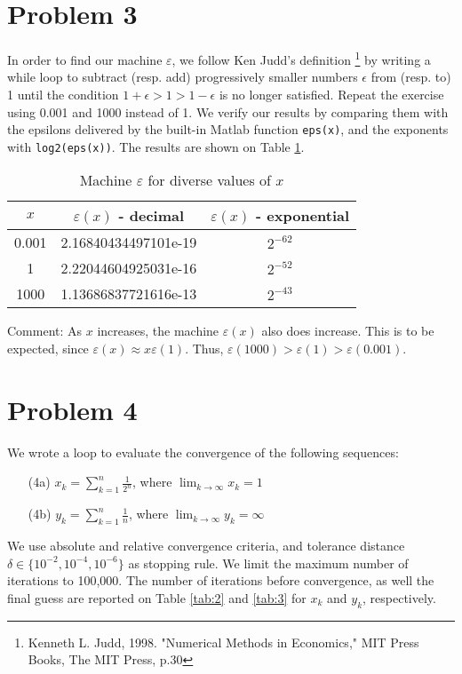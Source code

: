 \documentclass[11pt]{article}
\newcommand{\1}{\mathbbm{1}}
\newcounter{daggerfootnote}
\newcommand*{\daggerfootnote}[1]{%
	\setcounter{daggerfootnote}{\value{footnote}}%
	\renewcommand*{\thefootnote}{\fnsymbol{footnote}}%
	\footnote[2]{#1}%
	\setcounter{footnote}{\value{daggerfootnote}}%
	\renewcommand*{\thefootnote}{\arabic{footnote}}%
}
\begin{document}
\section*{Problem 3}
	In order to find our machine $\varepsilon$, we follow Ken Judd's definition\daggerfootnote{Kenneth L. Judd, 1998. "Numerical Methods in Economics," MIT Press Books, The MIT Press, p.30} by writing a while loop to subtract (resp. add) progressively smaller numbers $\epsilon$ from (resp. to) 1 until the condition $1+\epsilon > 1 > 1-\epsilon$ is no longer satisfied. Repeat the exercise using 0.001 and 1000 instead of 1. We verify our results by comparing them with the epsilons delivered by the built-in Matlab function \texttt{eps(x)}, and the exponents with \texttt{log2(eps(x))}. The results are shown on Table \ref{tab:1}.
	
	\begin{table}[h]
		\centering
		\begin{tabular}{ | c | c | c |}
			\hline
			\hline
			$x$ & $\varepsilon(x)$ - decimal & $\varepsilon(x)$ - exponential \\	
			\hline
			0.001 & 2.16840434497101e-19 & $2^{-62}$ \\ \hline
			1 & 2.22044604925031e-16 & $2^{-52}$ \\ \hline
			1000 & 1.13686837721616e-13 & $2^{-43}$ \\
			\hline
			\hline
		\end{tabular} 
		\caption{Machine $\varepsilon$ for diverse values of $x$}
		\label{tab:1}
	\end{table}
Comment: As $x$ increases, the machine $\varepsilon(x)$ also does increase. This is to be expected, since $\varepsilon(x)\approx x\varepsilon(1)$. Thus, $\varepsilon(1000)>\varepsilon(1)>\varepsilon(0.001)$.
	
\section*{Problem 4} 
We wrote a loop to evaluate the convergence of the following sequences: 
\begin{enumerate}
	\item[(4a)] $x_k=\sum_{k=1}^{n}\frac{1}{2^n}$, where $\lim_{k\rightarrow\infty}x_k=1$
	\item[(4b)] $y_k=\sum_{k=1}^{n}\frac{1}{n}$, where $\lim_{k\rightarrow\infty}y_k=\infty$
\end{enumerate}
We use absolute and relative convergence criteria, and tolerance distance $\delta\in\{10^{-2},10^{-4},10^{-6}\}$ as stopping rule. We limit the maximum number of iterations to 100,000. The number of iterations before convergence, as well the final guess are reported on Table \ref{tab:2} and \ref{tab:3} for $x_k$ and $y_k$, respectively.
\end{document}

